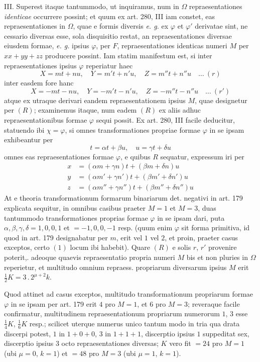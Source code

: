 III. Superest itaque tantummodo, ut inquiramus, num in $\Omega$ repraesentationes \textit{identicae} occurrere possint; et quum ex art. 280, III iam constet, eas repraesentationes in $\Omega$, quae e formis diversis \textit{e. g.} ex $\varphi$ et $\varphi'$ derivatae sint, ne%
%
cessario diversas esse, sola disquisitio restat, an repraesentationes diversae eiusdem formae, \textit{e. g.} ipsius $\varphi$, per $F$, repraesentationes identicas numeri $M$ per $xx+yy+zz$ producere possint. Iam statim manifestum est, si inter repraesentationes ipsius $\varphi$ reperiatur haec
\[
X=mt+nu,\quad Y=m't+n'u,\quad Z=m''t+n''u\quad\ldots\ (r)
\]
inter easdem fore hanc
\[
X=-mt-nu,\quad Y=-m't-n'u,\quad Z=-m''t-n''u\quad\ldots\ (r')
\]
atque ex utraque derivari eandem repraesentationem ipsius $M$, quae designetur per $(R)$; examinemus itaque, num eadem $(R)$ ex aliis adhuc repraesentationibus formae $\varphi$ sequi possit. Ex art. 280, III facile deducitur, statuendo ibi $\chi=\varphi$, si omnes transformationes propriae formae $\varphi$ in se ipsam exhibeantur per
\[
t=\alpha t+\beta u,\quad u=\gamma t+\delta u
\]
omnes eas repraesentationes formae $\varphi$, e quibus $R$ sequatur, expressum iri per
\[
\begin{aligned}
x&=(\alpha m+\gamma n)t+(\beta m+\delta n)u\\
y&=(\alpha m'+\gamma n')t+(\beta m'+\delta n')u\\
z&=(\alpha m''+\gamma n'')t+(\beta m''+\delta n'')u
\end{aligned}
\]
At e theoria transformationum formarum binariarum det. negativi in art. 179 explicata sequitur, in omnibus casibus praeter $M=1$ et $M=3$, duas tantummodo transformationes proprias formae $\varphi$ in se ipsam dari, puta $\alpha,\allowbreak \beta,\allowbreak \gamma,\allowbreak \delta=1,\allowbreak 0,\allowbreak 0,\allowbreak 1$ et $=-1,0,0,-1$ resp. (quum enim $\varphi$ sit forma primitiva, id quod in art. 179 designabatur per $m$, erit vel $1$ vel $2$, et proin, praeter casus exceptos, certo $(1)$ locum ibi habebit). Quare $(R)$ e solis $r$, $r'$ provenire poterit,. adeoque quaevis repraesentatio propria numeri $M$ bis et non pluries in $\Omega$ reperietur, et multitudo omnium repraess. propriarum diversarum ipsius $M$ erit $\tfrac{1}{2}K=3\,\allowbreak  .\,\allowbreak  2^{\mu+2}k$.

Quod attinet ad casus exceptos, multitudo transformationum propriarum formae $\varphi$ in se ipsam per art. 179 erit $4$ pro $M=1$, et $6$ pro $M=3$; reveraque facile confirmatur, multitudinem repraesentationum propriarum numerorum $1$, $3$ esse $\tfrac{1}{4}K$, $\tfrac{1}{6}K$ resp.; scilicet uterque numerus unico tantum modo in tria qua%
%
drata discerpi potest, $1$ in $1+0+0$, $3$ in $1+1+1$, discerptio ipsius $1$ suppeditat sex, discerptio ipsius $3$ octo repraesentationes diversas; $K$ vero fit $=24$ pro $M=1$ (ubi $\mu=0$, $k=1$) et $=48$ pro $M=3$ (ubi $\mu=1$, $k=1$).

